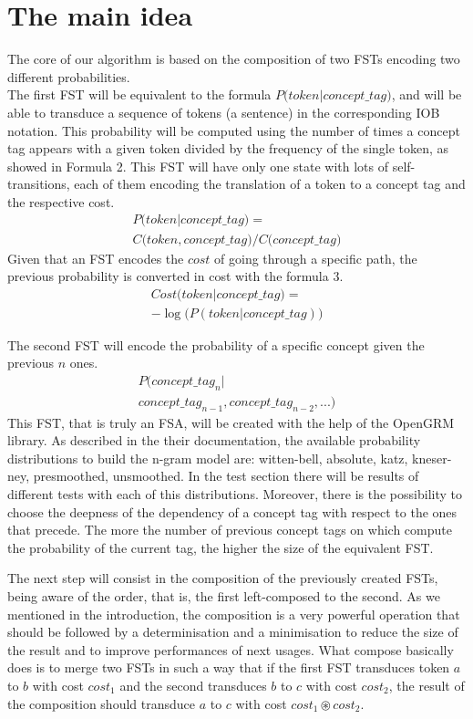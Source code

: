 \documentclass[11pt,a4paper]{article}
\begin{document}
\section{The main idea}

The core of our algorithm is based on the composition of two FSTs encoding two different probabilities.\\
The first FST will be equivalent to the formula $ P \big( token \big | concept\_tag ) $, and will be able to transduce a sequence of tokens (a sentence) in the corresponding IOB notation. This probability will be computed using the number of times a concept tag appears with a given token divided by the frequency of the single token, as showed in Formula 2. This FST will have only one state with lots of self-transitions, each of them encoding the translation of a token to a concept tag and the respective cost.
\begin{multline}
P \big( token | concept\_tag \big) = \\
C \big( token,concept\_tag \big) / C \big( concept\_tag \big)
\end{multline}
Given that an FST encodes the $cost$ of going through a specific path, the previous probability is converted in cost with the formula 3.
\begin{multline}
Cost \big( token | concept\_tag \big) = \\
- \log\big(P ( token | concept\_tag )\big)
\end{multline}

The second FST will encode the probability of a specific concept given the previous $n$ ones.
\begin{multline}
P \big( concept\_tag_n | \\
 concept\_tag_{n-1}, concept\_tag_{n-2}, ... \big) 
\end{multline}
This FST, that is truly an FSA, will be created with the help of the OpenGRM library. As described in the their documentation, the available probability distributions to build the n-gram model are: witten-bell, absolute, katz, kneser-ney, presmoothed, unsmoothed. In the test section there will be results of different tests with each of this distributions. Moreover, there is the possibility to choose the deepness of the dependency of a concept tag with respect to the ones that precede. The more the number of previous concept tags on which compute the probability of the current tag, the higher the size of the equivalent FST.

The next step will consist in the composition of the previously created FSTs, being aware of the order, that is, the first left-composed to the second. As we mentioned in the introduction, the composition is a very powerful operation that should be followed by a determinisation and a minimisation to reduce the size of the result and to improve performances of next usages. What compose basically does is to merge two FSTs in such a way that if the first FST transduces token $a$ to $b$ with cost $cost_1$ and the second transduces $b$ to $c$ with cost $cost_2$, the result of the composition should transduce $a$ to $c$ with cost $ cost_1 \circledast cost_2 $.
\end{document}
